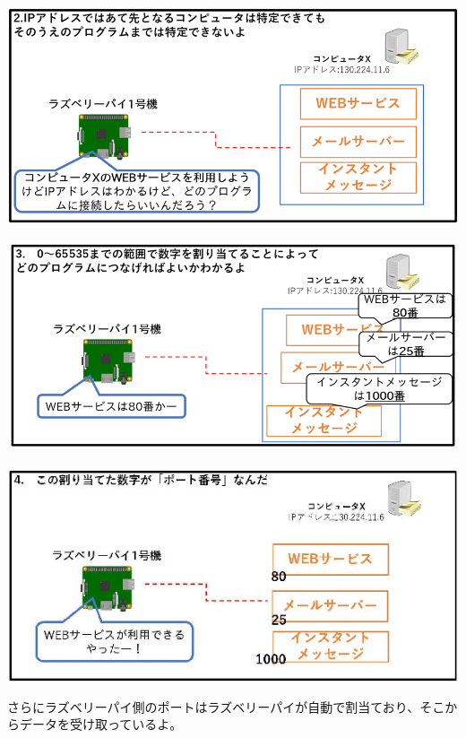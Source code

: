 \documentclass[a4paper,12pt,dvipdfmx]{jarticle}
\begin{document}
\centering
\includegraphics[width=16.496cm]{ome7-img022.png}
\flushleft


\bigskip

\clearpage

\centering
\includegraphics[width=16.843cm]{ome7-img023.png}



\centering
\includegraphics[width=16.875cm]{ome7-img024}
\flushleft


\bigskip


\bigskip


\bigskip

さらにラズベリーパイ側のポートはラズベリーパイが自動で割当ており、そこからデータを受け取っているよ。
\end{document}
